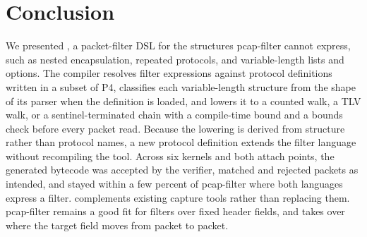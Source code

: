 \section{Conclusion}
\label{sec:conclusion}

We presented \kunai, a packet-filter DSL for the structures
pcap-filter cannot express, such as nested encapsulation, repeated
protocols, and variable-length lists and options. The compiler
resolves filter expressions against protocol definitions written in a
subset of P4, classifies each variable-length structure from the
shape of its parser when the definition is loaded, and lowers it to a
counted walk, a TLV walk, or a sentinel-terminated chain with a
compile-time bound and a bounds check before every packet read.
Because the lowering is derived from structure rather than protocol
names, a new protocol definition extends the filter language without
recompiling the tool. Across six kernels and both attach points, the
generated bytecode was accepted by the verifier, matched and rejected
packets as intended, and stayed within a few percent of pcap-filter
where both languages express a filter. \kunai complements existing
capture tools rather than replacing them. pcap-filter remains a good
fit for filters over fixed header fields, and \kunai takes over where
the target field moves from packet to packet.